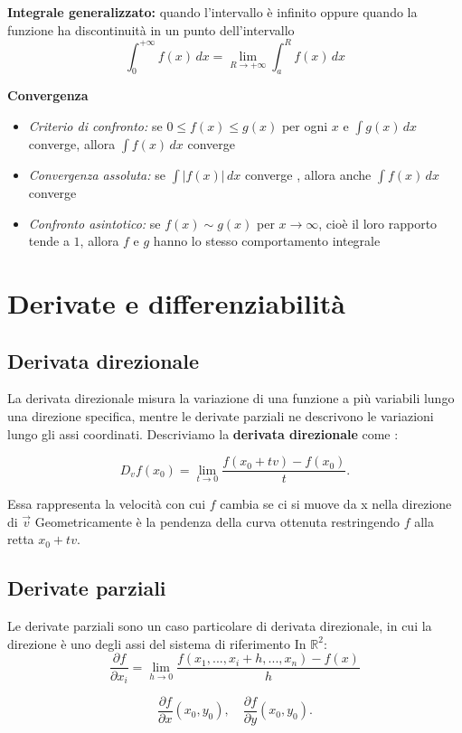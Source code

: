 \documentclass[a4paper,12pt]{article}
\begin{document}
\textbf{Integrale generalizzato: }quando l'intervallo è infinito oppure quando la funzione ha discontinuità in un punto dell'intervallo 
\[\int_0^{+\infty} f(x)\,dx = \lim_{R \to +\infty}\int_a^Rf(x)\,dx\]

\textbf{Convergenza}
    \begin{itemize}
        \item \textit{Criterio di confronto:} se $0 \leq f(x) \leq g(x)$ per ogni $x$ e $\int g(x)\,dx$ converge, allora $\int f(x)\, dx$ converge
        \item \textit{Convergenza assoluta: } se $\int |f(x)| \,dx$ converge , allora anche $\int f(x)\,dx$ converge
        \item \textit{Confronto asintotico: } se $f(x) \sim g(x)$ per $x \to \infty$, cioè il loro rapporto tende a $1$, allora $f$ e $g$ hanno lo stesso comportamento integrale  
    \end{itemize}

\section{Derivate e differenziabilità}

\subsection{Derivata direzionale}
La derivata direzionale misura la variazione di una funzione a più variabili lungo una direzione specifica, mentre le derivate parziali ne descrivono le variazioni lungo gli assi coordinati.
Descriviamo la \textbf{derivata direzionale} come :

\[
D_v f(x_0)=\lim_{t\to 0}\frac{f(x_0+tv)-f(x_0)}{t}.
\]

Essa rappresenta la velocità con cui $f$ cambia  se ci si muove da x nella direzione di $\Vec{ v}$ 
Geometricamente è la pendenza della curva ottenuta restringendo $f$ alla retta $x_0+tv$.

\subsection{Derivate parziali}
Le derivate parziali sono un caso particolare di derivata direzionale, in cui la direzione è uno degli assi del sistema di riferimento 
In $\mathbb{R}^2$:
\[\frac{\partial{f}}{\partial{x_i}}= \lim_{h \to 0}\frac{f(x_1, ...,x_i+h,...,x_n)-f(x)}{h}\]

\[
\frac{\partial f}{\partial x}(x_0,y_0),\quad \frac{\partial f}{\partial y}(x_0,y_0).
\]
\end{document}
